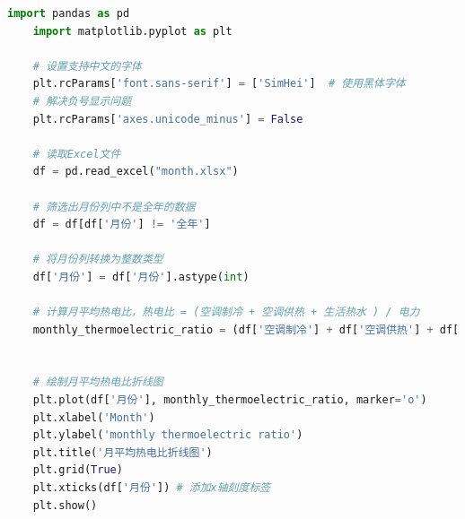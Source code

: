 \documentclass[UTF8]{ctexart}
\begin{document}
\begin{lstlisting}[language=Python]
    import pandas as pd
    import matplotlib.pyplot as plt
    
    # 设置支持中文的字体
    plt.rcParams['font.sans-serif'] = ['SimHei']  # 使用黑体字体
    # 解决负号显示问题
    plt.rcParams['axes.unicode_minus'] = False  
    
    # 读取Excel文件
    df = pd.read_excel("month.xlsx")   
    
    # 筛选出月份列中不是全年的数据
    df = df[df['月份'] != '全年']
    
    # 将月份列转换为整数类型
    df['月份'] = df['月份'].astype(int)
    
    # 计算月平均热电比，热电比 = (空调制冷 + 空调供热 + 生活热水 ) / 电力
    monthly_thermoelectric_ratio = (df['空调制冷'] + df['空调供热'] + df['生活热水']) / df['电力']
    
    
    # 绘制月平均热电比折线图
    plt.plot(df['月份'], monthly_thermoelectric_ratio, marker='o')
    plt.xlabel('Month')
    plt.ylabel('monthly thermoelectric ratio')
    plt.title('月平均热电比折线图')
    plt.grid(True)
    plt.xticks(df['月份']) # 添加x轴刻度标签
    plt.show()
    
\end{lstlisting}
\end{document}
